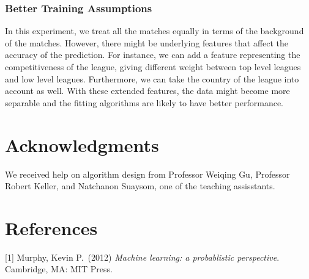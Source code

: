 \documentclass{article}
\begin{document}
\subsubsection{Better Training Assumptions}

In this experiment, we treat all the matches equally in terms of the background of the matches. However, there might be underlying features that affect the accuracy of the prediction. For instance, we can add a feature representing the competitiveness of the league, giving different weight between top level leagues and low level leagues. Furthermore, we can take the country of the league into account as well. With these extended features, the data might become more separable and the fitting algorithms are likely to have better performance.

\section*{Acknowledgments}

We received help on algorithm design from Professor Weiqing Gu, Professor Robert Keller, and Natchanon Suaysom, one of the teaching assisstants.

\section*{References}

	\medskip
	
	\small
	
	[1] Murphy, Kevin P.\ (2012)  {\it Machine learning: a probablistic perspective}. Cambridge, MA: MIT Press.
	
\end{document}
